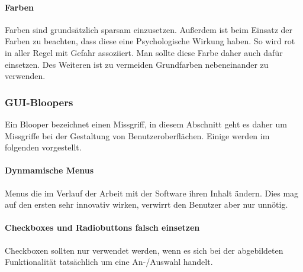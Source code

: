 \paragraph{Farben}

Farben sind grundsätzlich sparsam einzusetzen. Außerdem ist beim Einsatz der
Farben zu beachten, dass diese eine Psychologische Wirkung haben. So wird rot in
aller Regel mit Gefahr assoziiert. Man sollte diese Farbe daher auch dafür
einsetzen. Des Weiteren ist zu vermeiden Grundfarben nebeneinander zu verwenden.

\subsubsection{GUI-Bloopers}

Ein Blooper bezeichnet einen Missgriff, in diesem Abschnitt geht es daher um
Missgriffe bei der Gestaltung von Benutzeroberflächen. Einige werden im
folgenden vorgestellt.

\paragraph{Dynmamische Menus}

Menus die im Verlauf der Arbeit mit der Software ihren Inhalt ändern. Dies mag
auf den ersten sehr innovativ wirken, verwirrt den Benutzer aber nur unnötig.

\paragraph{Checkboxes und Radiobuttons falsch einsetzen}

Checkboxen sollten nur verwendet werden, wenn es sich bei der abgebildeten
Funktionalität tatsächlich um eine An-/Auswahl handelt.

